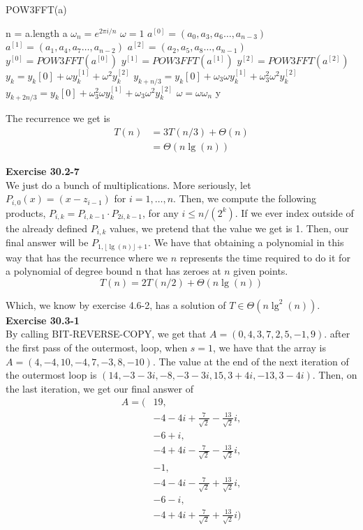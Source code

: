 \documentclass{article}
\begin{document}
\begin{algorithm}
\caption{POW3FFT(a)}
\begin{algorithmic}
\State n = a.length
\State \Return a
\EndIf
\State $\omega_n = e^{2\pi i/n}$
\State $\omega =1$
\State $a^{[0]} = (a_0,a_3,a_6\ldots, a_{n-3})$
\State $a^{[1]} = (a_1,a_4,a_7\ldots, a_{n-2})$
\State $a^{[2]} = (a_2,a_5,a_8\ldots, a_{n-1})$
\State $y^{[0]} = POW3FFT(a^{[0]})$
\State $y^{[1]} = POW3FFT(a^{[1]})$
\State $y^{[2]} = POW3FFT(a^{[2]})$
\State $y_k = y_k[0] +\omega y_k^{[1]} + \omega^2 y_{k}^{[2]}$
\State $y_{k+n/3} = y_k[0] +\omega_3\omega y_k^{[1]} + \omega_3^2\omega^2 y_{k}^{[2]}$
\State $y_{k+2n/3} = y_k[0] +\omega_3^2\omega y_k^{[1]} + \omega_3\omega^2 y_{k}^{[2]}$
\State $\omega = \omega \omega_n$
\EndFor
\State\Return y
\end{algorithmic}
\end{algorithm}

The recurrence we get is
\begin{align*}
T(n) &= 3 T(n/3) + \Theta(n)\\
&= \Theta(n\lg(n))
\end{align*}



\noindent\textbf{Exercise 30.2-7}\\
We just do a bunch of multiplications. More seriously, let $P_{i,0}(x) = (x-z_{i-1})$ for $i=1,\ldots,n$. Then, we compute the following products, $P_{i,k} = P_{i,k-1} \cdot P_{2i,k-1}$, for any $i\le n/(2^k)$. If we ever index outside of the already defined $P_{i,k}$ values, we pretend that the value we get is 1. Then, our final answer will be $P_{1,\lfloor\lg(n)\rfloor+1}$. We have that obtaining a polynomial in this way that has the recurrence where we $n$ represents the time required to do it for a polynomial of degree bound n that has zeroes at $n$ given points.
\[
T(n) = 2T(n/2) + \Theta(n\lg(n))
\]

Which, we know by exercise 4.6-2, has a solution of $T\in \Theta(n\lg^2(n))$.\\



\noindent\textbf{Exercise 30.3-1}\\
By calling BIT-REVERSE-COPY, we get that $A = (0,4,3,7,2,5,-1,9)$. after the first pass of the outermost, loop, when $s=1$, we have that the array is $A= (4,-4,10,-4,7,-3,8,-10)$. The value at the end of the next iteration of the outermost loop is $(14,-3-3i,-8,-3-3i,15,3+4i,-13,3-4i)$. Then, on the last iteration, we get our final answer of 
\begin{align*}
A = (&19,\\
&-4-4i+\frac{7}{\sqrt{2}} -\frac{13}{\sqrt{2}}i,\\
&-6+i,\\
&-4+4i-\frac{7}{\sqrt{2}} -\frac{13}{\sqrt{2}}i,\\
&-1,\\
&-4-4i-\frac{7}{\sqrt{2}} +\frac{13}{\sqrt{2}}i,\\
&-6-i,\\
&-4+4i+\frac{7}{\sqrt{2}} +\frac{13}{\sqrt{2}}i)
\end{align*}\\
\end{document}

